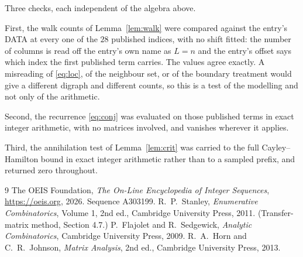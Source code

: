 \documentclass[11pt,a4paper]{article}
\theoremstyle{plain}
\theoremstyle{definition}
\begin{document}
Three checks, each independent of the algebra above.

First, the walk counts of Lemma~\ref{lem:walk} were compared against the entry's DATA at
every one of the $28$ published indices, with no shift fitted: the number of columns is
read off the entry's own name as $L=n$ and the entry's offset says which index the first
published term carries. The values agree exactly. A misreading of \eqref{eq:loc}, of the
neighbour set, or of the boundary treatment would give a different digraph and different
counts, so this is a test of the modelling and not only of the arithmetic.

Second, the recurrence \eqref{eq:conj} was evaluated on those published terms in exact
integer arithmetic, with no matrices involved, and vanishes wherever it applies.

Third, the annihilation test of Lemma~\ref{lem:crit} was carried to the full
Cayley--Hamilton bound in exact integer arithmetic rather than to a sampled prefix, and
returned zero throughout.

\begin{thebibliography}{9}
 The OEIS Foundation, \emph{The On-Line Encyclopedia of Integer
Sequences}, \url{https://oeis.org}, 2026. Sequence A303199.
 R.~P.~Stanley, \emph{Enumerative Combinatorics}, Volume 1, 2nd ed.,
Cambridge University Press, 2011. (Transfer-matrix method, Section 4.7.)
 P.~Flajolet and R.~Sedgewick, \emph{Analytic Combinatorics}, Cambridge
University Press, 2009.
 R.~A.~Horn and C.~R.~Johnson, \emph{Matrix Analysis}, 2nd ed., Cambridge
University Press, 2013.
\end{thebibliography}
\end{document}
